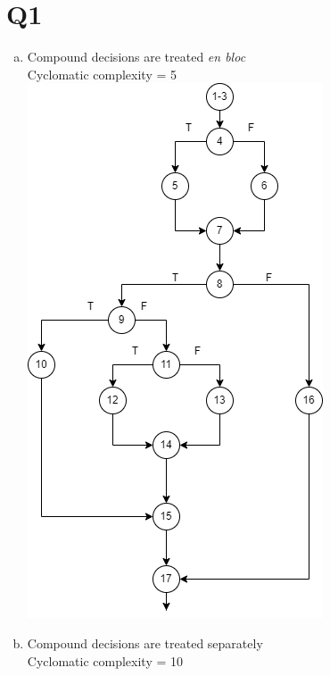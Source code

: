 \documentclass[12pt, letterpaper, titlepage]{article}
\begin{document}
 
\singlespacing
\section*{Q1}
\begin{enumerate}[a)]
    \item Compound decisions are treated \textit{en bloc} \\
    Cyclomatic complexity = 5 \\
    \includegraphics[scale=0.39]{Image1.png}
    \item Compound decisions are treated separately \\
    Cyclomatic complexity = 10 \\

\end{enumerate}
\end{document}
